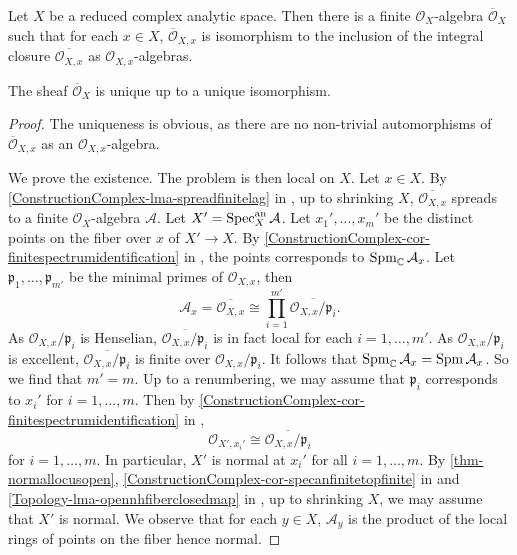 \begin{proposition}\label{prop-normalizationcas}
    Let $X$ be a reduced complex analytic space. Then there is a finite $\mathcal{O}_X$-algebra $\overline{\mathcal{O}}_X$ such that for each $x\in X$, $\overline{\mathcal{O}}_{X,x}$ is isomorphism to the inclusion of the integral closure $\overline{\mathcal{O}_{X,x}}$ as $\mathcal{O}_{X,x}$-algebras.

    The sheaf $\overline{\mathcal{O}}_X$ is unique up to a unique isomorphism.
\end{proposition}
\begin{proof}
    The uniqueness is obvious, as there are no non-trivial automorphisms of $\overline{\mathcal{O}}_{X,x}$ as an $\mathcal{O}_{X,x}$-algebra.

    We prove the existence. The problem is then local on $X$. Let $x\in X$. By \cref{ConstructionComplex-lma-spreadfinitelag} in , up to shrinking $X$,
    $\overline{\mathcal{O}_{X,x}}$ spreads to a finite $\mathcal{O}_X$-algebra $\mathcal{A}$. Let $X'=\operatorname{Spec}^{\mathrm{an}}_X\mathcal{A}$. Let $x_1',\ldots,x_m'$ be the distinct points on the fiber over $x$ of $X'\rightarrow X$. By  \cref{ConstructionComplex-cor-finitespectrumidentification} in , the points corresponds to $\operatorname{Spm}_{\mathbb{C}} \mathcal{A}_x$. Let $\mathfrak{p}_1,\ldots,\mathfrak{p}_{m'}$ be the minimal primes of $\mathcal{O}_{X,x}$, then 
    \[
        \mathcal{A}_x=\overline{\mathcal{O}_{X,x}}\cong \prod_{i=1}^{m'}   \overline{\mathcal{O}_{X,x}/\mathfrak{p}_i}.
    \]
    As $\mathcal{O}_{X,x}/\mathfrak{p}_i$ is Henselian, $\overline{\mathcal{O}_{X,x}/\mathfrak{p}_i}$ is in fact local for each $i=1,\ldots,m'$. As $\mathcal{O}_{X,x}/\mathfrak{p}_i$ is excellent, $\overline{\mathcal{O}_{X,x}/\mathfrak{p}_i}$ is finite over $\mathcal{O}_{X,x}/\mathfrak{p}_i$. It follows that $\operatorname{Spm}_{\mathbb{C}}\mathcal{A}_x=\operatorname{Spm} \mathcal{A}_x$. So we find that $m'=m$. Up to a renumbering, we may assume that $\mathfrak{p}_i$ corresponds to $x_i'$ for $i=1,\ldots,m$. Then by \cref{ConstructionComplex-cor-finitespectrumidentification} in ,
    \[
        \mathcal{O}_{X',x_i'}\cong  \overline{\mathcal{O}_{X,x}/\mathfrak{p}_i} 
    \]
    for $i=1,\ldots,m$. In particular, $X'$ is normal at $x_i'$ for all $i=1,\ldots,m$.
    By \cref{thm-normallocusopen}, \cref{ConstructionComplex-cor-specanfinitetopfinite} in  and \cref{Topology-lma-opennhfiberclosedmap} in , up to shrinking $X$, we may assume that $X'$ is normal. We observe that for each $y\in X$, $\mathcal{A}_{y}$ is the product of the local rings of points on the fiber hence normal.


\end{proof}
